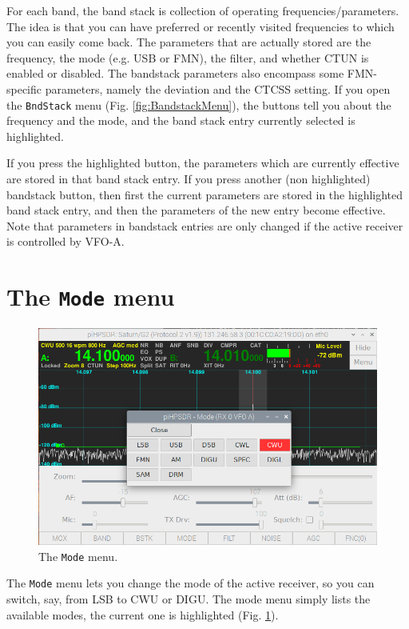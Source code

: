 \documentclass[12pt]{book}
\def\bltt#1{\texttt{\color{blue}#1}}
\begin{document}
For each band, the band stack is collection of operating frequencies/parameters. The idea is that
you can have preferred or recently visited frequencies to which you can easily come back.
The parameters that are actually stored are the frequency, the mode (e.g. USB or FMN),
the filter, and whether CTUN is enabled or disabled. The bandstack parameters
also encompass some FMN-specific parameters,  namely the deviation and
the  CTCSS setting.
If you open the \bltt{BndStack} menu (Fig. \ref{fig:BandstackMenu}), the buttons
tell you about the frequency and the mode, and the band stack entry currently selected is highlighted.

If you press the highlighted button, the parameters which are currently effective are stored in that band stack
entry. If you press another (non highlighted) bandstack button, then first the current
parameters are stored in the highlighted band stack entry, and then the parameters of the
new entry become effective. Note that parameters in bandstack entries are only changed if the active
receiver is controlled by VFO-A.

\section{The \texttt{Mode} menu}
\begin{figure}[ht]
\center
\includegraphics[width=12cm]{ModeMenu.png}
\caption{The \bltt{Mode} menu.}
\label{fig:ModeMenu}
\end{figure}

The \bltt{Mode} menu lets you change the mode of the active receiver, so you can switch,
say, from LSB to CWU or DIGU. The mode menu simply lists the available modes, the current
one is highlighted (Fig. \ref{fig:ModeMenu}).
\end{document}
